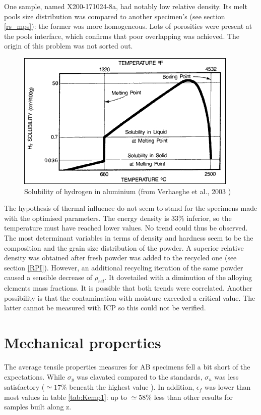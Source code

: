 One sample, named X200-171024-8a, had notably low relative density. Its melt pools size distribution was compared to another specimen's (see section \ref{rs_mps}): the former was more homogeneous. Lots of porosities were present at the pools interface, which confirms that poor overlapping was achieved. The origin of this problem was not sorted out. \\


\begin{figure}[ht]
	\centering
	\centerline{\includegraphics[scale=0.75]{Images/Solub}}
	\decoRule
	\caption[Solubility of hydrogen in aluminium.]{Solubility of hydrogen in aluminium (from Verhaeghe et al., 2003 \parencite{Verhaeghe})}
	\label{fig:Solub}
\end{figure}

The hypothesis of thermal influence do not seem to stand for the specimens made with the optimised parameters. The energy density is 33\% inferior, so the temperature must have reached lower values. No trend could thus be observed. The most determinant variables in terms of density and hardness seem to be the composition and the grain size distribution of the powder. A superior relative density was obtained after fresh powder was added to the recycled one (see section \ref{RPI}). However, an additional recycling iteration of the same powder caused a sensible decrease of $\rho_{rel}$. It dovetailed with a diminution of the alloying elements mass fractions. It is possible that both trends were correlated. Another possibility is that the contamination with moisture exceeded a critical value. The latter cannot be measured with ICP so this could not be verified.

\section{Mechanical properties}
\label{DMPP}
The average tensile properties measures for AB specimens fell a bit short of the expectations. While $\sigma_y$ was elavated compared to the standards, $\sigma_u$ was less satisfactory ($\simeq 17\%$ beneath the highest value \parencite{EOS}). In addition, $\epsilon_f$ was lower than most values in table \ref{tab:Kemp1}: up to $\simeq 58\%$ less than other results for samples built along z. \\%

